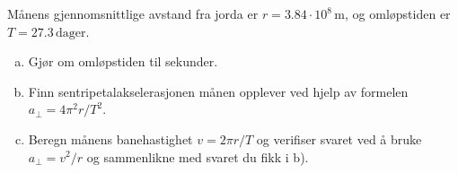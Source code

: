 %
Månens gjennomsnittlige avstand fra jorda er $r = 3.84 \cdot 10^8\,\si{\metre}$, og omløpstiden er $T = 27.3\,\textrm{dager}$.
\begin{enumerate}[a)]
    \item Gjør om omløpstiden til sekunder.
    \item Finn sentripetalakselerasjonen månen opplever ved hjelp av formelen $a_\perp = 4\pi^2 r / T^2$.
    \item Beregn månens banehastighet $v = 2\pi r / T$ og verifiser svaret ved å bruke $a_\perp = v^2/r$ og sammenlikne med svaret du fikk i b).
\end{enumerate}
